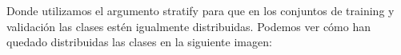 \documentclass[12pt]{article}
\begin{document}
Donde utilizamos el argumento stratify para que en los conjuntos de training y validación las clases estén igualmente distribuidas. Podemos ver cómo han quedado distribuidas las clases en la siguiente imagen:

\begin{figure}[H]
\centering
\end{figure}
\end{document}
